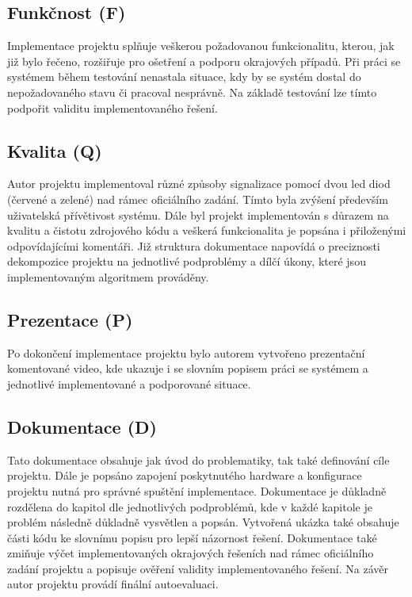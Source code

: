 \documentclass[a4paper, 12pt]{article}
\begin{document}
\subsection{Funkčnost (F)}
Implementace projektu splňuje veškerou požadovanou funkcionalitu, kterou, jak již bylo řečeno, rozšiřuje pro ošetření a podporu okrajových případů. Při práci se systémem během testování nenastala situace, kdy by se systém dostal do nepožadovaného stavu či pracoval nesprávně. Na základě testování lze tímto podpořit validitu implementovaného řešení.

\subsection{Kvalita (Q)}
Autor projektu implementoval různé způsoby signalizace pomocí dvou led diod (červené a zelené) nad rámec oficiálního zadání. Tímto byla zvýšení především uživatelská přívětivost systému. Dále byl projekt implementován s důrazem na kvalitu a čistotu zdrojového kódu a veškerá funkcionalita je popsána i přiloženými odpovídajícími komentáři. Již struktura dokumentace napovídá o preciznosti dekompozice projektu na jednotlivé podproblémy a dílčí úkony, které jsou implementovaným algoritmem prováděny.

\subsection{Prezentace (P)}
Po dokončení implementace projektu bylo autorem vytvořeno prezentační komentované video, kde ukazuje i se slovním popisem práci se systémem a jednotlivé implementované a podporované situace.

\subsection{Dokumentace (D)}
Tato dokumentace obsahuje jak úvod do problematiky, tak také definování cíle projektu. Dále je popsáno zapojení poskytnutého hardware a konfigurace projektu nutná pro správné spuštění implementace. Dokumentace je důkladně rozdělena do kapitol dle jednotlivých podproblémů, kde v každé kapitole je problém následně důkladně vysvětlen a popsán. Vytvořená ukázka také obsahuje části kódu ke slovnímu popisu pro lepší názornost řešení. Dokumentace také zmiňuje výčet implementovaných okrajových řešeních nad rámec oficiálního zadání projektu a popisuje ověření validity implementovaného řešení. Na závěr autor projektu provádí finální autoevaluaci.


\renewcommand{\refname}{Použitá literatura}

\end{document}

